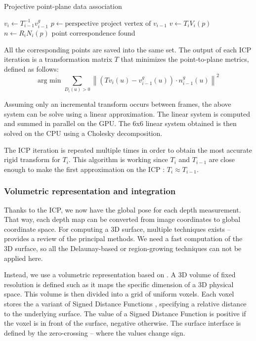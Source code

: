 \documentclass[12pt]{article}
\begin{document}
\begin{algorithm}
\caption{Projective point-plane data association}\label{algo1}
\begin{algorithmic}[1]
  \State $v_i \gets T_{i-1}^{-1}v_{i-1}^g$
  \State $p \gets \text{perspective project vertex of } v_{i-1}$
    \State $v \gets T_iV_i(p)$
    \State $n \gets R_iN_i(p)$
      \State point correspondence found
      \EndIf
    \EndIf
  \EndIf
\EndFor
\end{algorithmic}
\end{algorithm}

All the corresponding points are saved into the same set. The output of each ICP iteration is a transformation matrix $T$ that minimizes the point-to-plane metrics, defined as follows:
$$\text{arg min } \sum_{D_i(u)>0} \left\|(Tv_i(u)-v_{i-1}^g(u))\cdot n_{i-1}^g(u) \right\|^2$$

Assuming only an incremental transform occurs between frames, the above system can be solve using a linear approximation. The linear system is computed and summed in parallel on the GPU. The 6x6 linear system obtained is then solved on the CPU using a Cholesky decomposition.

The ICP iteration is repeated multiple times in order to obtain the most accurate rigid transform for $T_i$. This algorithm is working since $T_i$ and $T_{i-1}$ are close enough to make the first approximation on the ICP : $T_i \approx T_{i-1}$.

\subsubsection{Volumetric representation and integration}
Thanks to the ICP, we now have the global pose for each depth measurement. That way, each depth map can be converted from image coordinates to global coordinate space. For computing a 3D surface, multiple techniques exists -- \cite{ISO} provides a review of the principal methods. We need a fast computation of the 3D surface, so all the Delaunay-based or region-growing techniques can not be applied here.

Instead, we use a volumetric representation based on \cite{VolRep}. A 3D volume of fixed resolution is defined such as it maps the specific dimension of a 3D physical space. This volume is then divided into a grid of uniform voxels. Each voxel stores the a variant of Signed Distance Functions \cite{SDF}, specifying a relative distance to the underlying surface. The value of a Signed Distance Function is positive if the voxel is in front of the surface, negative otherwise. The surface interface is defined by the zero-crossing -- where the values change sign.
\end{document}
